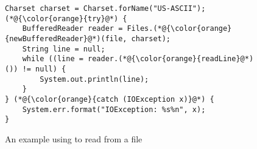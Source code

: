 \begin{figure}[t]%
	\centering
\begin{lstlisting}[]
Charset charset = Charset.forName("US-ASCII");
(*@{\color{orange}{try}@*) {
    BufferedReader reader = Files.(*@{\color{orange}{newBufferedReader}@*)(file, charset);
    String line = null;
    while ((line = reader.(*@{\color{orange}{readLine}@*)()) != null) {
        System.out.println(line);
    }
} (*@{\color{orange}{catch (IOException x)}@*) {
    System.err.format("IOException: %s%n", x);
}
\end{lstlisting}
        \vspace{-16pt}
        \caption{An example using  to read from a file}
        \label{fig:example4}
\end{figure}
